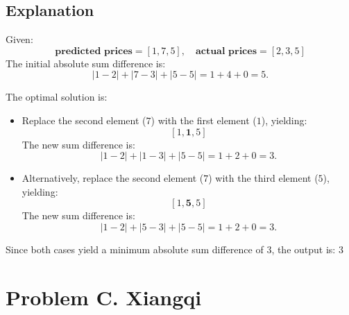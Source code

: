 \documentclass[12pt,a4paper]{article}
\begin{document}
\subsection*{\fontsize{16}{12}Explanation}
Given:
\[
\textbf{predicted prices} = [1, 7, 5], \quad \textbf{actual prices} = [2, 3, 5]
\]
The initial absolute sum difference is:
\[
\left| 1 - 2 \right| + \left| 7 - 3 \right| + \left| 5 - 5 \right| = 1 + 4 + 0 = 5.
\]

\noindent The optimal solution is:
\begin{itemize}
    \item Replace the second element ($7$) with the first element ($1$), yielding:
    \[
    [1, \mathbf{1}, 5]
    \]
    The new sum difference is:
    \[
    \left| 1 - 2 \right| + \left| 1 - 3 \right| + \left| 5 - 5 \right| = 1 + 2 + 0 = 3.
    \]
    
    \item Alternatively, replace the second element ($7$) with the third element ($5$), yielding:
    \[
    [1, \mathbf{5}, 5]
    \]
    The new sum difference is:
    \[
    \left| 1 - 2 \right| + \left| 5 - 3 \right| + \left| 5 - 5 \right| = 1 + 2 + 0 = 3.
    \]
\end{itemize}

\noindent Since both cases yield a minimum absolute sum difference of \( 3 \), the output is: $3$
\newpage

\section*{\fontsize{18}{12}Problem C. Xiangqi }
\end{document}
